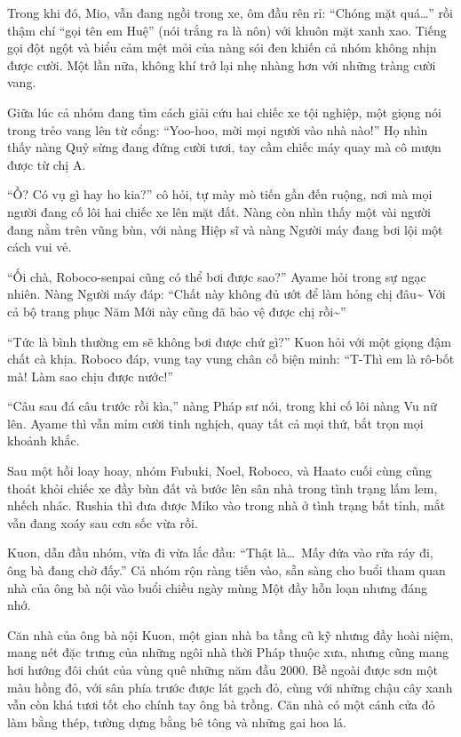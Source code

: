 \documentclass[../main.tex]{subfiles}
\begin{document}
Trong khi đó, Mio, vẫn đang ngồi trong xe, ôm đầu rên rỉ: ``Chóng mặt quá\dots'' rồi thậm chí ``gọi tên em Huệ'' (nói trắng ra là nôn) với khuôn mặt xanh xao. Tiếng gọi đột ngột và biểu cảm mệt mỏi của nàng sói đen khiến cả nhóm không nhịn được cười. Một lần nữa, không khí trở lại nhẹ nhàng hơn với những tràng cười vang.

\ct

Giữa lúc cả nhóm đang tìm cách giải cứu hai chiếc xe tội nghiệp, một giọng nói trong trẻo vang lên từ cổng: ``Yoo-hoo, mời mọi người vào nhà nào!'' Họ nhìn thấy nàng Quỷ sừng đang đứng cười tươi, tay cầm chiếc máy quay mà cô mượn được từ chị A.

``Ồ? Có vụ gì hay ho kia?'' cô hỏi, tự mày mò tiến gần đến ruộng, nơi mà mọi người đang cố lôi hai chiếc xe lên mặt đất. Nàng còn nhìn thấy một vài người đang nằm trên vũng bùn, với nàng Hiệp sĩ và nàng Người máy đang bơi lội một cách vui vẻ.

``Ối chà, Roboco-senpai cũng có thể bơi được sao?'' Ayame hỏi trong sự ngạc nhiên. Nàng Người máy đáp: ``Chất này không đủ ướt để làm hỏng chị đâu\~{} Với cả bộ trang phục Năm Mới này cũng đã bảo vệ được chị rồi\~{}''

``Tức là bình thường em sẽ không bơi được chứ gì?'' Kuon hỏi với một giọng đậm chất cà khịa. Roboco đáp, vung tay vung chân cố biện minh: ``T-Thì em là rô-bốt mà! Làm sao chịu được nước!''

``Câu sau đá câu trước rồi kìa,'' nàng Pháp sư nói, trong khi cố lôi nàng Vu nữ lên. Ayame thì vẫn mỉm cười tinh nghịch, quay tất cả mọi thứ, bắt trọn mọi khoảnh khắc.

Sau một hồi loay hoay, nhóm Fubuki, Noel, Roboco, và Haato cuối cùng cũng thoát khỏi chiếc xe đầy bùn đất và bước lên sân nhà trong tình trạng lấm lem, nhếch nhác. Rushia thì đưa được Miko vào trong nhà ở tình trạng bất tỉnh, mắt vẫn đang xoáy sau cơn sốc vừa rồi.

Kuon, dẫn đầu nhóm, vừa đi vừa lắc đầu: ``Thật là\dots\ Mấy đứa vào rửa ráy đi, ông bà đang chờ đấy.'' Cả nhóm rộn ràng tiến vào, sẵn sàng cho buổi tham quan nhà của ông bà nội vào buổi chiều ngày mùng Một đầy hỗn loạn nhưng đáng nhớ.

\ct

Căn nhà của ông bà nội Kuon, một gian nhà ba tầng cũ kỹ nhưng đầy hoài niệm, mang nét đặc trưng của những ngôi nhà thời Pháp thuộc xưa, nhưng cũng mang hơi hướng đôi chút của vùng quê những năm đầu 2000. Bề ngoài được sơn một màu hồng đỏ, với sân phía trước được lát gạch đỏ, cùng với những chậu cây xanh vẫn còn khá tươi tốt cho chính tay ông bà trồng. Căn nhà có một cánh cửa đỏ làm bằng thép, tường dựng bằng bê tông và những gai hoa lá.
\end{document}
